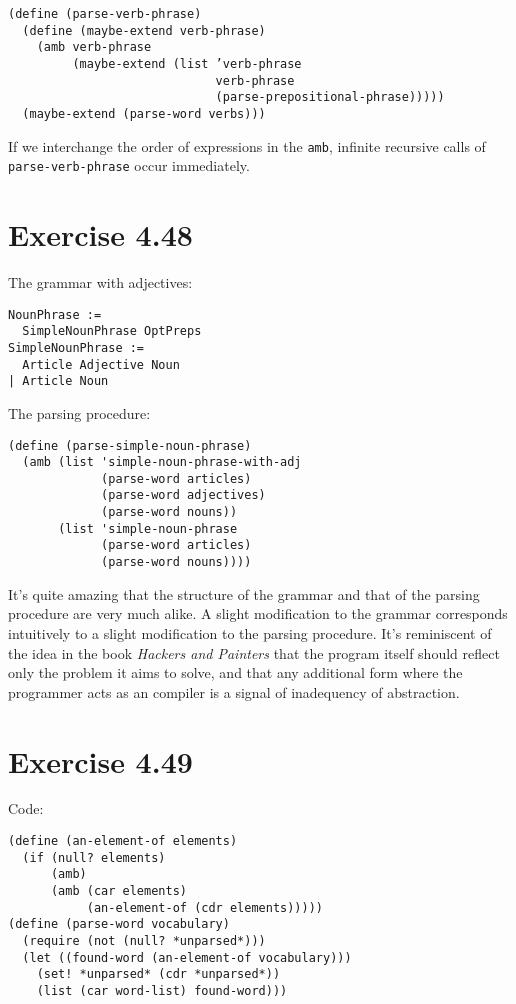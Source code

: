 \documentclass[../main.tex]{subfiles}
\begin{document}
\begin{lstlisting}
(define (parse-verb-phrase)
  (define (maybe-extend verb-phrase)
    (amb verb-phrase
         (maybe-extend (list ’verb-phrase
                             verb-phrase
                             (parse-prepositional-phrase)))))
  (maybe-extend (parse-word verbs)))
\end{lstlisting}

If we interchange the order of expressions in the \lstinline{amb}, infinite recursive calls of \lstinline{parse-verb-phrase} occur immediately.

\section{Exercise 4.48}

The grammar with adjectives:

\begin{lstlisting}
NounPhrase :=
  SimpleNounPhrase OptPreps
SimpleNounPhrase :=
  Article Adjective Noun
| Article Noun
\end{lstlisting}

The parsing procedure:

\begin{lstlisting}
(define (parse-simple-noun-phrase)
  (amb (list 'simple-noun-phrase-with-adj
             (parse-word articles)
             (parse-word adjectives)
             (parse-word nouns))
       (list 'simple-noun-phrase
             (parse-word articles)
             (parse-word nouns))))
\end{lstlisting}

It's quite amazing that the structure of the grammar and that of the parsing procedure are very much alike. A slight modification to the grammar corresponds intuitively to a slight modification to the parsing procedure. It's reminiscent of the idea in the book \textit{Hackers and Painters} that the program itself should reflect only the problem it aims to solve, and that any additional form where the programmer acts as an compiler is a signal of inadequency of abstraction.

\section{Exercise 4.49}

Code:

\begin{lstlisting}
(define (an-element-of elements)
  (if (null? elements)
      (amb)
      (amb (car elements)
           (an-element-of (cdr elements)))))
(define (parse-word vocabulary)
  (require (not (null? *unparsed*)))
  (let ((found-word (an-element-of vocabulary)))
    (set! *unparsed* (cdr *unparsed*))
    (list (car word-list) found-word)))
\end{lstlisting}
\end{document}
